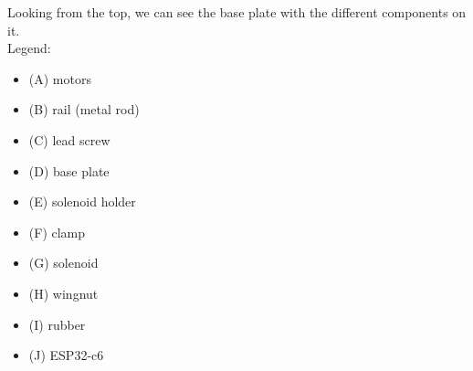 \begin{minipage}[t]{0.45\textwidth}
    \centering{}
\end{minipage}\hfill
\begin{minipage}[t]{0.5\textwidth}
    Looking from the top, we can see the base plate with the different components on it.\\

    Legend:
    \begin{itemize}
        \item (A) motors
        \item (B) rail (metal rod)
        \item (C) lead screw
        \item (D) base plate
        \item (E) solenoid holder
        \item (F) clamp
        \item (G) solenoid
        \item (H) wingnut
        \item (I) rubber
        \item (J) ESP32-c6
    \end{itemize}
\end{minipage}



